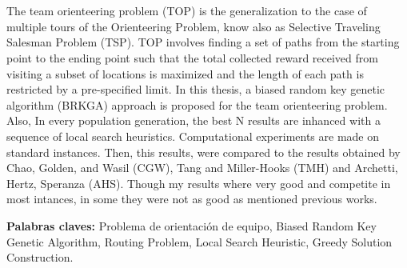 \chapter*{\tituloAbstractEs}

\noindent The team orienteering problem (TOP) is the generalization to the case of multiple tours of the Orienteering Problem, know also as Selective Traveling Salesman Problem (TSP). TOP involves finding a set of paths from the starting point to the ending point such that the total collected reward received from visiting a subset of locations is maximized and the length of each path is restricted by a pre-specified limit. In this thesis, a biased random key genetic algorithm (BRKGA) approach is proposed for the team orienteering problem. Also, In every population generation, the best N results are inhanced with a sequence of local search heuristics. Computational experiments are made on standard instances. Then, this results, were compared to the results obtained by Chao, Golden, and Wasil (CGW), Tang and Miller-Hooks (TMH) and Archetti, Hertz, Speranza (AHS). Though my results where very good and competite in most intances, in some they were not as good as mentioned previous works.

\bigskip

\noindent\textbf{Palabras claves:} Problema de orientación de equipo, Biased Random Key Genetic Algorithm, Routing Problem, Local Search Heuristic, Greedy Solution Construction.